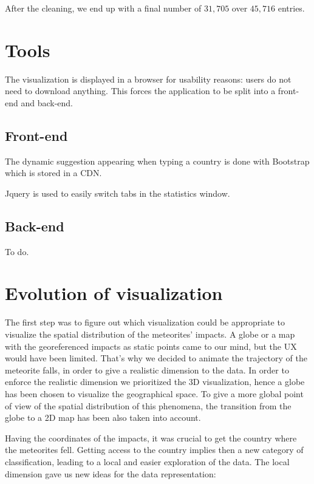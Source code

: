 \documentclass[10pt,conference,compsocconf]{IEEEtran}
\begin{document}
After the cleaning, we end up with a final number of $31,705$ over $45,716$ entries.

\section{Tools}
\label{sec:tools}

The visualization is displayed in a browser for usability reasons: users do not need to download anything. This forces the application to be split into a front-end and back-end.

\subsection{Front-end}

The dynamic suggestion appearing when typing a country is done with Bootstrap which is stored in a CDN.

Jquery is used to easily switch tabs in the statistics window.


\subsection{Back-end}

To do.

\newpage
\section{Evolution of visualization}
\label{sec:evolution_of_visualization}

The first step was to figure out which visualization could be appropriate to visualize the spatial distribution of the meteorites' impacts. A globe or a map with the georeferenced impacts as static points came to our mind, but the UX would have been limited. That's why we decided to animate the trajectory of the meteorite falls, in order to give a realistic dimension to the data. In order to enforce the realistic dimension we prioritized the 3D visualization, hence a globe has been chosen to visualize the geographical space. To give a more global point of view of the spatial distribution of this phenomena, the transition from the globe to a 2D map has been also taken into account. 

Having the coordinates of the impacts, it was crucial to get the country where the meteorites fell. Getting access to the country implies then a new category of classification, leading to a local and easier exploration of the data. The local dimension gave us new ideas for the data representation: 
\end{document}
